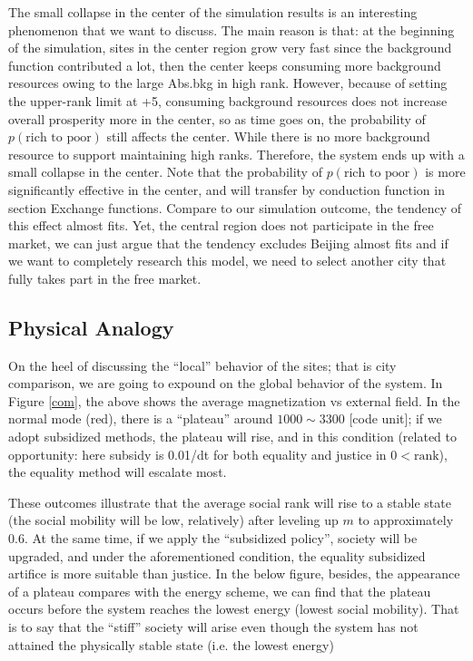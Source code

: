 \documentclass[10pt]{article}
\begin{document}
\begin{multicols}{2}
        The small collapse in the center of the simulation results is an interesting phenomenon that we want to discuss. The main reason is that: at the beginning of the simulation, sites in the center region grow very fast since the background function contributed a lot, then the center keeps consuming more background resources owing to the large Abs.bkg in high rank. However, because of setting the upper-rank limit at +5, consuming background resources does not increase overall prosperity more in the center, so as time goes on, the probability of $p(\text{rich to poor})$ still affects the center. While there is no more background resource to support maintaining high ranks. Therefore, the system ends up with a small collapse in the center. Note that the probability of $p(\text{rich to poor})$ is more significantly effective in the center, and will transfer by conduction function in section Exchange functions. Compare to our simulation outcome, the tendency of this effect almost fits. Yet, the central region does not participate in the free market, we can just argue that the tendency excludes Beijing almost fits and if we want to completely research this model, we need to select another city that fully takes part in the free market.
    
    \subsection{Physical Analogy}
        On the heel of discussing the ``local'' behavior of the sites; that is city comparison, we are going to expound on the global behavior of the system. In Figure \ref{com}, the above shows the average magnetization vs external field. In the normal mode (red), there is a ``plateau'' around $1000 \sim 3300$ [code unit]; if we adopt subsidized methods, the plateau will rise, and in this condition (related to opportunity: here subsidy is 0.01/dt for both equality and justice in $0<\text{rank}$), the equality method will escalate most. 
        
        These outcomes illustrate that the average social rank will rise to a stable state (the social mobility will be low, relatively) after leveling up $m$ to approximately $0.6$. At the same time, if we apply the ``subsidized policy'', society will be upgraded, and under the aforementioned condition, the equality subsidized artifice is more suitable than justice. In the below figure, besides, the appearance of a plateau compares with the energy scheme, we can find that the plateau occurs before the system reaches the lowest energy (lowest social mobility). That is to say that the ``stiff'' society will arise even though the system has not attained the physically stable state (i.e. the lowest energy)


\end{multicols}
\end{document}
